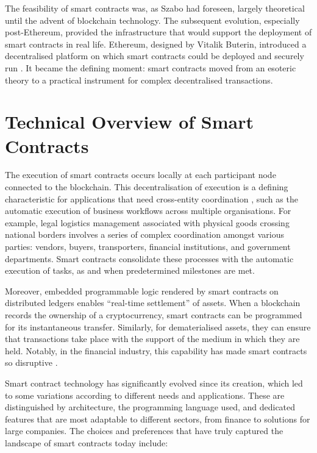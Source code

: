 The feasibility of smart contracts was, as Szabo had foreseen, largely theoretical until the advent of blockchain technology. The subsequent evolution, especially post-Ethereum, provided the infrastructure that would support the deployment of smart contracts in real life. Ethereum, designed by Vitalik Buterin, introduced a decentralised platform on which smart contracts could be deployed and securely run \cite{Buterin2014}. It became the defining moment: smart contracts moved from an esoteric theory to a practical instrument for complex decentralised transactions.

\section{Technical Overview of Smart Contracts}

The execution of smart contracts occurs locally at each participant node connected to the blockchain. This decentralisation of execution is a defining characteristic for applications that need cross-entity coordination \cite{MagazzeniEtAl2017}, such as the automatic execution of business workflows across multiple organisations. For example, legal logistics management associated with physical goods crossing national borders involves a series of complex coordination amongst various parties: vendors, buyers, transporters, financial institutions, and government departments. Smart contracts consolidate these processes with the automatic execution of tasks, as and when predetermined milestones are met.

Moreover, embedded programmable logic rendered by smart contracts on distributed ledgers enables ``real-time settlement'' of assets. When a blockchain records the ownership of a cryptocurrency, smart contracts can be programmed for its instantaneous transfer. Similarly, for dematerialised assets, they can ensure that transactions take place with the support of the medium in which they are held. Notably, in the financial industry, this capability has made smart contracts so disruptive \cite{MagazzeniEtAl2017, Smith2020}.


Smart contract technology has significantly evolved since its creation, which led to some variations according to different needs and applications. These are distinguished by architecture, the programming language used, and dedicated features that are most adaptable to different sectors, from finance to solutions for large companies. The choices and preferences that have truly captured the landscape of smart contracts today include:

